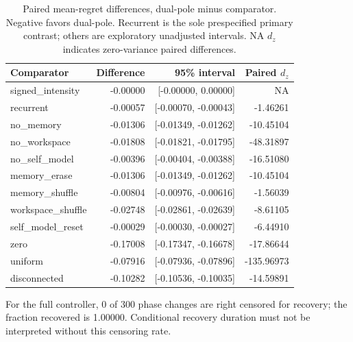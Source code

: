 \begin{table}[htbp]
\centering\small
\begin{tabular}{lrrr}
\hline
Comparator & Difference & 95\% interval & Paired $d_z$ \\
\hline
signed\_intensity & -0.00000 & [-0.00000, 0.00000] & NA \\
recurrent & -0.00057 & [-0.00070, -0.00043] & -1.46261 \\
no\_memory & -0.01306 & [-0.01349, -0.01262] & -10.45104 \\
no\_workspace & -0.01808 & [-0.01821, -0.01795] & -48.31897 \\
no\_self\_model & -0.00396 & [-0.00404, -0.00388] & -16.51080 \\
memory\_erase & -0.01306 & [-0.01349, -0.01262] & -10.45104 \\
memory\_shuffle & -0.00804 & [-0.00976, -0.00616] & -1.56039 \\
workspace\_shuffle & -0.02748 & [-0.02861, -0.02639] & -8.61105 \\
self\_model\_reset & -0.00029 & [-0.00030, -0.00027] & -6.44910 \\
zero & -0.17008 & [-0.17347, -0.16678] & -17.86644 \\
uniform & -0.07916 & [-0.07936, -0.07896] & -135.96973 \\
disconnected & -0.10282 & [-0.10536, -0.10035] & -14.59891 \\
\hline
\end{tabular}
\caption{Paired mean-regret differences, dual-pole minus comparator. Negative favors dual-pole. Recurrent is the sole prespecified primary contrast; others are exploratory unadjusted intervals. NA $d_z$ indicates zero-variance paired differences.}
\end{table}
For the full controller, 0 of 300 phase changes are right censored for recovery; the fraction recovered is 1.00000. Conditional recovery duration must not be interpreted without this censoring rate.

